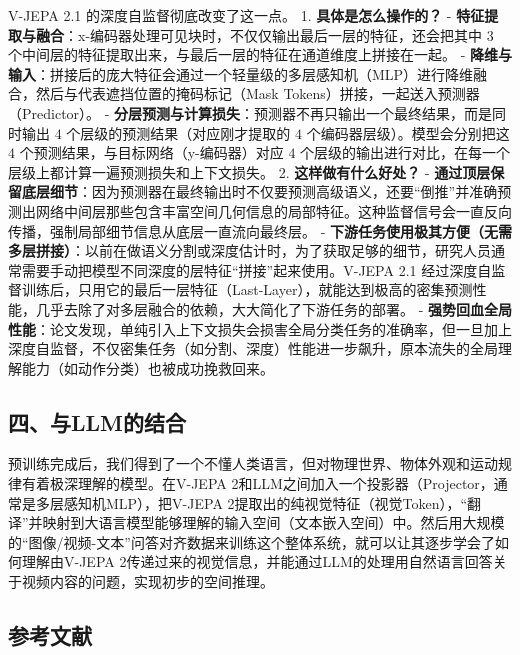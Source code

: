 V-JEPA 2.1 的深度自监督彻底改变了这一点。
1. \textbf{具体是怎么操作的？}
- \textbf{特征提取与融合}：x-编码器处理可见块时，不仅仅输出最后一层的特征，还会把其中 \(3\) 个中间层的特征提取出来，与最后一层的特征在通道维度上拼接在一起。
- \textbf{降维与输入}：拼接后的庞大特征会通过一个轻量级的多层感知机（MLP）进行降维融合，然后与代表遮挡位置的掩码标记（Mask Tokens）拼接，一起送入预测器（Predictor）。
- \textbf{分层预测与计算损失}：预测器不再只输出一个最终结果，而是同时输出 \(4\) 个层级的预测结果（对应刚才提取的 \(4\) 个编码器层级）。模型会分别把这 \(4\) 个预测结果，与目标网络（y-编码器）对应 \(4\) 个层级的输出进行对比，在每一个层级上都计算一遍预测损失和上下文损失。
2. \textbf{这样做有什么好处？}
- \textbf{通过顶层保留底层细节}：因为预测器在最终输出时不仅要预测高级语义，还要``倒推''并准确预测出网络中间层那些包含丰富空间几何信息的局部特征。这种监督信号会一直反向传播，强制局部细节信息从底层一直流向最终层。
- \textbf{下游任务使用极其方便（无需多层拼接）}：以前在做语义分割或深度估计时，为了获取足够的细节，研究人员通常需要手动把模型不同深度的层特征``拼接''起来使用。V-JEPA 2.1 经过深度自监督训练后，只用它的最后一层特征（Last-Layer），就能达到极高的密集预测性能，几乎去除了对多层融合的依赖，大大简化了下游任务的部署。
- \textbf{强势回血全局性能}：论文发现，单纯引入上下文损失会损害全局分类任务的准确率，但一旦加上深度自监督，不仅密集任务（如分割、深度）性能进一步飙升，原本流失的全局理解能力（如动作分类）也被成功挽救回来。

\hypertarget{ux56dbux4e0ellmux7684ux7ed3ux5408}{%
\subsection{四、与LLM的结合}\label{ux56dbux4e0ellmux7684ux7ed3ux5408}}

预训练完成后，我们得到了一个不懂人类语言，但对物理世界、物体外观和运动规律有着极深理解的模型。在V-JEPA 2和LLM之间加入一个投影器（Projector，通常是多层感知机MLP），把V-JEPA 2提取出的纯视觉特征（视觉Token），``翻译''并映射到大语言模型能够理解的输入空间（文本嵌入空间）中。然后用大规模的``图像/视频-文本''问答对齐数据来训练这个整体系统，就可以让其逐步学会了如何理解由V-JEPA 2传递过来的视觉信息，并能通过LLM的处理用自然语言回答关于视频内容的问题，实现初步的空间推理。

\hypertarget{ux53c2ux8003ux6587ux732e-193}{%
\subsection{参考文献}\label{ux53c2ux8003ux6587ux732e-193}}

